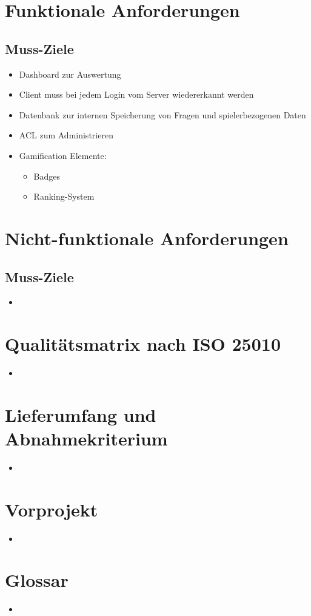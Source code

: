 \documentclass[11pt,a4paper]{scrreprt}
\begin{document}
\chapter{Funktionale Anforderungen}
\section{Muss-Ziele}
\begin{itemize}
\item Dashboard zur Auswertung
\item Client muss bei jedem Login vom Server wiedererkannt werden
\item Datenbank zur internen Speicherung von Fragen und spielerbezogenen Daten
\item ACL zum Administrieren
\item Gamification Elemente:
\begin{itemize}
\item Badges
\item Ranking-System
\end{itemize}
\end{itemize}
\chapter{Nicht-funktionale Anforderungen}
\section{Muss-Ziele}
\begin{itemize}
\item 
\end{itemize}
\chapter{Qualitätsmatrix nach ISO 25010}
\begin{itemize}
\item
\end{itemize}
\chapter{Lieferumfang und Abnahmekriterium}
\begin{itemize}
\item
\end{itemize}
\chapter{Vorprojekt}
\begin{itemize}
\item
\end{itemize}
\chapter{Glossar}
\begin{itemize}
\item
\end{itemize}
\end{document}
